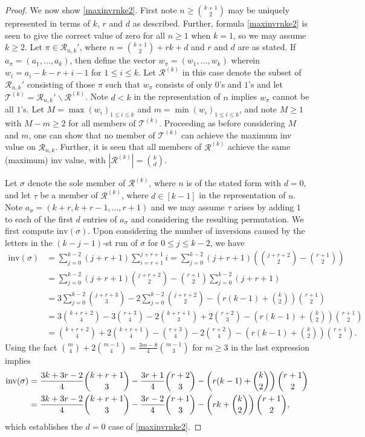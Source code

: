 \documentclass[11pt,a4paper]{article}
\begin{document}
\begin{proof}
We now show \eqref{maxinvrnke2}. First note $n \geq \binom{k+1}{2}$ may be uniquely represented in terms of $k$, $r$ and $d$ as described.  Further, formula \eqref{maxinvrnke2} is seen to give the correct value of zero for all $n \geq 1$ when $k=1$, so we may assume $k \geq 2$.  Let $\pi \in \mathcal{R}_{n,k}'$, where $n=\binom{k+1}{2}+rk+d$ and $r$ and $d$ are as stated.  If $a_\pi=(a_1,\ldots,a_k)$, then define the vector $w_\pi=(w_1,\ldots,w_k)$ wherein $w_i=a_i-k-r+i-1$ for $1 \leq i \leq k$. Let $\mathcal{R}^{(k)}$ in this case denote the subset of $\mathcal{R}_{n,k}'$ consisting of those $\pi$ such that $w_\pi$ consists of only $0$'s and $1$'s and let $\mathcal{T}^{(k)}=\mathcal{R}_{n,k}'\backslash \mathcal{R}^{(k)}$.  Note $d<k$ in the representation of $n$ implies $w_\pi$ cannot be all $1$'s. Let $M=\max(w_i)_{1 \leq i \leq k}$ and $m=\min(w_i)_{1 \leq i \leq k}$, and note $M \geq 1$ with $M -m \geq 2$ for all members of $\mathcal{T}^{(k)}$.  Proceeding as before considering $M$ and $m$, one can show that no member of $\mathcal{T}^{(k)}$ can achieve the maximum inv value on $\mathcal{R}_{n,k}$.  Further, it is seen that all members of $\mathcal{R}^{(k)}$ achieve the same (maximum) inv value, with $|\mathcal{R}^{(k)}|=\binom{k}{d}$.

Let $\sigma$ denote the sole member of $\mathcal{R}^{(k)}$, where $n$ is of the stated form with $d=0$, and let $\tau$ be a member of $\mathcal{R}^{(k)}$, where $d \in [k-1]$ in the representation of $n$.  Note $a_\sigma=(k+r,k+r-1,\ldots,r+1)$ and we may assume $\tau$ arises by adding $1$ to each of the first $d$ entries of $a_\sigma$ and considering the resulting permutation.  We first compute $\text{inv}(\sigma)$.  Upon considering the number of inversions caused by the letters in the $(k-j-1)$-st run of $\sigma$ for $0 \leq j \leq k-2$, we have
\begin{align*}
\text{inv}(\sigma)&=\sum_{j=0}^{k-2}(j+r+1)\sum_{i=r+1}^{j+r+1}i=\sum_{j=0}^{k-2}(j+r+1)\left(\binom{j+r+2}{2}-\binom{r+1}{2}\right)\\
&=\sum_{j=0}^{k-2}(j+r+1)\binom{j+r+2}{2}-\binom{r+1}{2}\sum_{j=0}^{k-2}(j+r+1)\\
&=3\sum_{j=0}^{k-2}\binom{j+r+3}{3}-2\sum_{j=0}^{k-2}\binom{j+r+2}{2}-\left(r(k-1)+\binom{k}{2}\right)\binom{r+1}{2}\\
&=3\binom{k+r+2}{4}-3\binom{r+3}{4}-2\binom{k+r+1}{3}+2\binom{r+2}{3}-\left(r(k-1)+\binom{k}{2}\right)\binom{r+1}{2}\\
&=\binom{k+r+2}{4}+2\binom{k+r+1}{4}-\binom{r+3}{4}-2\binom{r+2}{4}-\left(r(k-1)+\binom{k}{2}\right)\binom{r+1}{2}.
\end{align*}
Using the fact $\binom{m}{4}+2\binom{m-1}{4}=\frac{3m-8}{4}\binom{m-1}{3}$ for $m \geq 3$ in the last expression implies
\begin{align}
\text{inv}(\sigma)&=\frac{3k+3r-2}{4}\binom{k+r+1}{3}-\frac{3r+1}{4}\binom{r+2}{3}-\left(r(k-1)+\binom{k}{2}\right)\binom{r+1}{2}\notag\\
&=\frac{3k+3r-2}{4}\binom{k+r+1}{3}-\frac{3r-2}{4}\binom{r+1}{3}-\left(rk+\binom{k}{2}\right)\binom{r+1}{2},\label{d=0case(b)}
\end{align}
which establishes the $d=0$ case of \eqref{maxinvrnke2}.


\end{proof}
\end{document}
